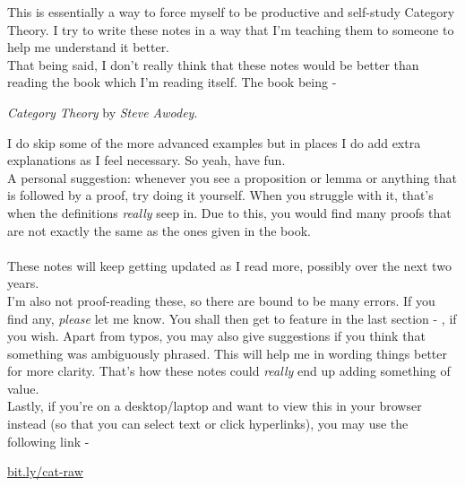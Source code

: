 This is essentially a way to force myself to be productive and self-study Category Theory. I try to write these notes in a way that I'm teaching them to someone to help me understand it better.\\
That being said, I don't really think that these notes would be better than reading the book which I'm reading itself. The book being - 
\begin{center}
	\emph{Category Theory} by \emph{Steve Awodey}.
\end{center}
I do skip some of the more advanced examples but in places I do add extra explanations as I feel necessary. So yeah, have fun.\\
A personal suggestion: whenever you see a proposition or lemma or anything that is followed by a proof, try doing it yourself. When you struggle with it, that's when the definitions \emph{really} seep in. Due to this, you would find many proofs that are not exactly the same as the ones given in the book. \\~\\
These notes will keep getting updated as I read more, possibly over the next two years.\\
I'm also not proof-reading these, so there are bound to be many errors. If you find any, \emph{please} let me know. You shall then get to feature in the last section - , if you wish. Apart from typos, you may also give suggestions if you think that something was ambiguously phrased. This will help me in wording things better for more clarity. That's how these notes could \emph{really} end up adding something of value.\\
Lastly, if you're on a desktop/laptop and want to view this in your browser instead (so that you can select text or click hyperlinks), you may use the following link - 
\begin{center}
	\url{bit.ly/cat-raw}
\end{center}